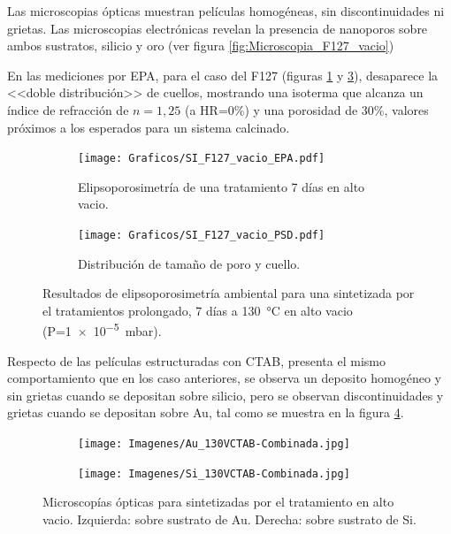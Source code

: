 {		\pagebreak

		Las microscopias ópticas muestran películas homogéneas, sin discontinuidades ni grietas. Las microscopias electrónicas revelan la presencia de nanoporos sobre ambos sustratos, silicio y oro (ver figura \ref{fig:Microscopia_F127_vacio}) 

		En las mediciones por EPA, para el caso del F127 (figuras \ref{fig:F127_vacio_EPA} y \ref{fig:F127_vacio_PSD}), desaparece la <<doble distribución>> de cuellos,  mostrando una isoterma que alcanza un índice de refracción de $n=1,25$ (a HR=0\%) y una porosidad de $30\%$, valores próximos a los esperados para un sistema calcinado.

		\begin{figure}[!ht]
			  	\begin{subfigure}[t]{0.495\textwidth}
			  	\texttt{[image: Graficos/SI\_F127\_vacio\_EPA.pdf]}
				\caption{Elipsoporosimetría de una \pdmF\space tratamiento 7 días en alto vacio.}
				\label{fig:F127_vacio_EPA}
				\end{subfigure}
				\begin{subfigure}[t]{0.495\textwidth}
			  	\texttt{[image: Graficos/SI\_F127\_vacio\_PSD.pdf]}
				\caption{Distribución de tamaño de poro y cuello.\\ }
				\label{fig:F127_vacio_PSD}
				\end{subfigure}
				\caption[Elipsoporosimetría \pdmF\space tratamiento alto vacio.]{Resultados de elipsoporosimetría ambiental para una \pdmF\space sintetizada por el tratamientos prolongado, 7 días a \SI{130}{\celsius} en alto vacio (P=\SI{1e-5}{\milli\bar}).}
				\end{figure}

		Respecto de las películas estructuradas con CTAB, presenta el mismo comportamiento que en los caso anteriores, se observa un deposito homogéneo y sin grietas cuando se depositan sobre silicio, pero se observan discontinuidades y grietas cuando se depositan sobre Au, tal como se muestra en la figura \ref{fig:Microscopia_CTAB_vacio}.
		
		\begin{figure}[!th]
		 	   	    \begin{subfigure}[t]{0.49\textwidth}
			       	\texttt{[image: Imagenes/Au\_130VCTAB-Combinada.jpg]}
			   		\end{subfigure}
			   		\begin{subfigure}[t]{0.49\textwidth}
			   	    \texttt{[image: Imagenes/Si\_130VCTAB-Combinada.jpg]}
			   		\end{subfigure}
					 \caption[Microscopía óptica \pdmC tratamiento vacío.]{Microscopías ópticas para \pdmC\space sintetizadas por el tratamiento en alto vacio. Izquierda: sobre sustrato de Au. Derecha: sobre sustrato de Si.}
					 \label{fig:Microscopia_CTAB_vacio}	
				     \end{figure}		     

}
